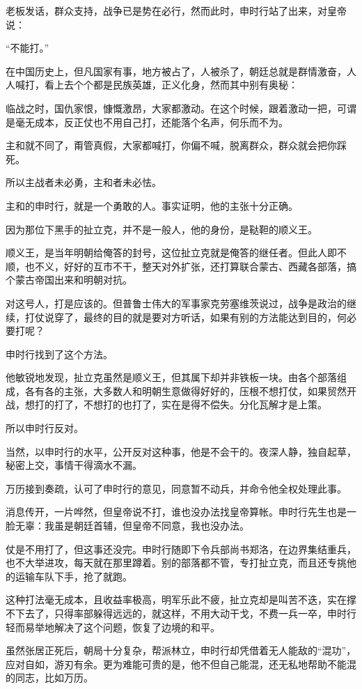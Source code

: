 \begin{multicols}{\theparacolNo}
		老板发话，群众支持，战争已是势在必行，然而此时，申时行站了出来，对皇帝说：

		“不能打。”

		在中国历史上，但凡国家有事，地方被占了，人被杀了，朝廷总就是群情激奋，人人喊打，看上去个个都是民族英雄，正义化身，然而其中别有奥秘：

		临战之时，国仇家恨，慷慨激昂，大家都激动。在这个时候，跟着激动一把，可谓是毫无成本，反正仗也不用自己打，还能落个名声，何乐而不为。

		主和就不同了，甭管真假，大家都喊打，你偏不喊，脱离群众，群众就会把你踩死。

		所以主战者未必勇，主和者未必怯。

		主和的申时行，就是一个勇敢的人。事实证明，他的主张十分正确。

		因为那位下黑手的扯立克，并不是一般人，他的身份，是鞑靼的顺义王。

		顺义王，是当年明朝给俺答的封号，这位扯立克就是俺答的继任者。但此人即不顺，也不义，好好的互市不干，整天对外扩张，还打算联合蒙古、西藏各部落，搞个蒙古帝国出来和明朝对抗。

		对这号人，打是应该的。但普鲁士伟大的军事家克劳塞维茨说过，战争是政治的继续，打仗说穿了，最终的目的就是要对方听话，如果有别的方法能达到目的，何必要打呢？

		申时行找到了这个方法。

		他敏锐地发现，扯立克虽然是顺义王，但其属下却并非铁板一块。由各个部落组成，各有各的主张，大多数人和明朝生意做得好好的，压根不想打仗，如果贸然开战，想打的打了，不想打的也打了，实在是得不偿失。分化瓦解才是上策。

		所以申时行反对。

		当然，以申时行的水平，公开反对这种事，他是不会干的。夜深人静，独自起草，秘密上交，事情干得滴水不漏。

		万历接到奏疏，认可了申时行的意见，同意暂不动兵，并命令他全权处理此事。

		消息传开，一片哗然，但皇帝说不打，谁也没办法找皇帝算帐。申时行先生也是一脸无辜：我虽是朝廷首辅，但皇帝不同意，我也没办法。

		仗是不用打了，但这事还没完。申时行随即下令兵部尚书郑洛，在边界集结重兵，也不大举进攻，每天就在那里蹲着。别的部落都不管，专打扯立克，而且还专挑他的运输车队下手，抢了就跑。

		这种打法毫无成本，且收益率极高，明军乐此不疲，扯立克却是叫苦不迭，实在撑不下去了，只得率部躲得远远的，就这样，不用大动干戈，不费一兵一卒，申时行轻而易举地解决了这个问题，恢复了边境的和平。

		虽然张居正死后，朝局十分复杂，帮派林立，申时行却凭借着无人能敌的“混功”，应对自如，游刃有余。更为难能可贵的是，他不但自己能混，还无私地帮助不能混的同志，比如万历。


\end{multicols}
